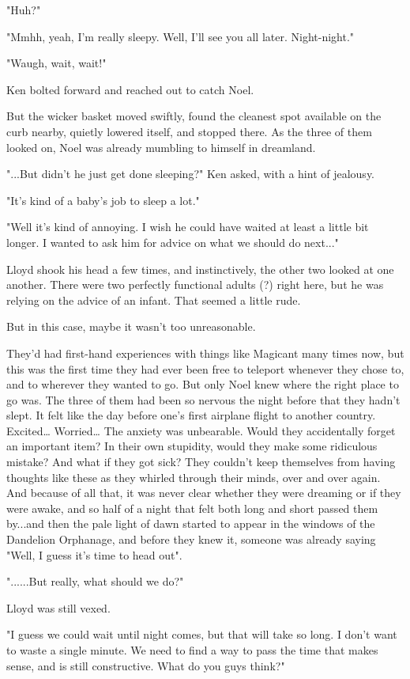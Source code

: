 \documentclass[
]{article}
\begin{document}
"Huh?"

"Mmhh, yeah, I'm really sleepy. Well, I'll see you all later.
Night-night."

"Waugh, wait, wait!"

Ken bolted forward and reached out to catch Noel.

But the wicker basket moved swiftly, found the cleanest spot available
on the curb nearby, quietly lowered itself, and stopped there. As the
three of them looked on, Noel was already mumbling to himself in
dreamland.

"...But didn't he just get done sleeping?" Ken asked, with a hint of
jealousy.

"It's kind of a baby's job to sleep a lot."

"Well it's kind of annoying. I wish he could have waited at least a
little bit longer. I wanted to ask him for advice on what we should do
next..."

Lloyd shook his head a few times, and instinctively, the other two
looked at one another. There were two perfectly functional adults (?)
right here, but he was relying on the advice of an infant. That seemed a
little rude.

But in this case, maybe it wasn't too unreasonable.

They'd had first-hand experiences with things like Magicant many times
now, but this was the first time they had ever been free to teleport
whenever they chose to, and to wherever they wanted to go. But only Noel
knew where the right place to go was. The three of them had been so
nervous the night before that they hadn't slept. It felt like the day
before one's first airplane flight to another country. Excited\ldots{}
Worried\ldots{} The anxiety was unbearable. Would they accidentally
forget an important item? In their own stupidity, would they make some
ridiculous mistake? And what if they got sick? They couldn't keep
themselves from having thoughts like these as they whirled through their
minds, over and over again. And because of all that, it was never clear
whether they were dreaming or if they were awake, and so half of a night
that felt both long and short passed them by...and then the pale light
of dawn started to appear in the windows of the Dandelion Orphanage, and
before they knew it, someone was already saying "Well, I guess it's time
to head out".

"......But really, what should we do?"

Lloyd was still vexed.

"I guess we could wait until night comes, but that will take so long. I
don't want to waste a single minute. We need to find a way to pass the
time that makes sense, and is still constructive. What do you guys
think?"
\end{document}
